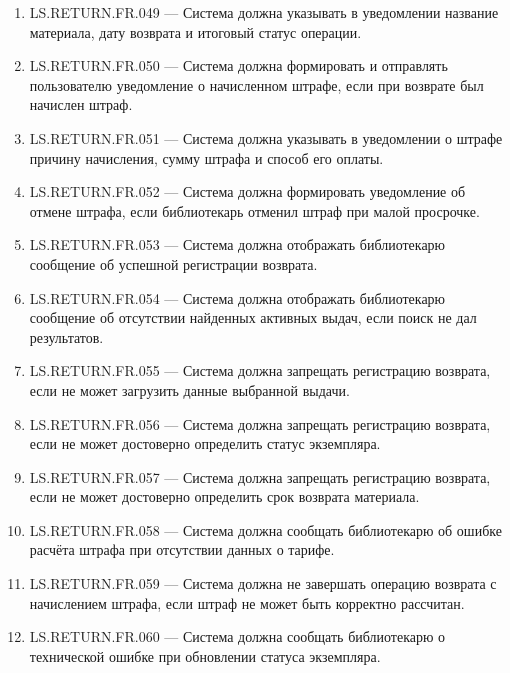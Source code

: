 \documentclass[12pt,a4paper]{article}
\begin{document}
\begin{enumerate}
		\item LS.RETURN.FR.049 --- Система должна указывать в уведомлении название
		материала, дату возврата и итоговый статус операции.
		
		\item LS.RETURN.FR.050 --- Система должна формировать и отправлять пользователю
		уведомление о начисленном штрафе, если при возврате был начислен штраф.
		
		\item LS.RETURN.FR.051 --- Система должна указывать в уведомлении о штрафе
		причину начисления, сумму штрафа и способ его оплаты.
		
		\item LS.RETURN.FR.052 --- Система должна формировать уведомление об отмене
		штрафа, если библиотекарь отменил штраф при малой просрочке.
		
		\item LS.RETURN.FR.053 --- Система должна отображать библиотекарю сообщение
		об успешной регистрации возврата.
		
		\item LS.RETURN.FR.054 --- Система должна отображать библиотекарю сообщение
		об отсутствии найденных активных выдач, если поиск не дал результатов.
		
		\item LS.RETURN.FR.055 --- Система должна запрещать регистрацию возврата, если
		не может загрузить данные выбранной выдачи.
		
		\item LS.RETURN.FR.056 --- Система должна запрещать регистрацию возврата, если
		не может достоверно определить статус экземпляра.
		
		\item LS.RETURN.FR.057 --- Система должна запрещать регистрацию возврата, если
		не может достоверно определить срок возврата материала.
		
		\item LS.RETURN.FR.058 --- Система должна сообщать библиотекарю об ошибке
		расчёта штрафа при отсутствии данных о тарифе.
		
		\item LS.RETURN.FR.059 --- Система должна не завершать операцию возврата с
		начислением штрафа, если штраф не может быть корректно рассчитан.
		
		\item LS.RETURN.FR.060 --- Система должна сообщать библиотекарю о технической
		ошибке при обновлении статуса экземпляра.
		

\end{enumerate}
\end{document}
